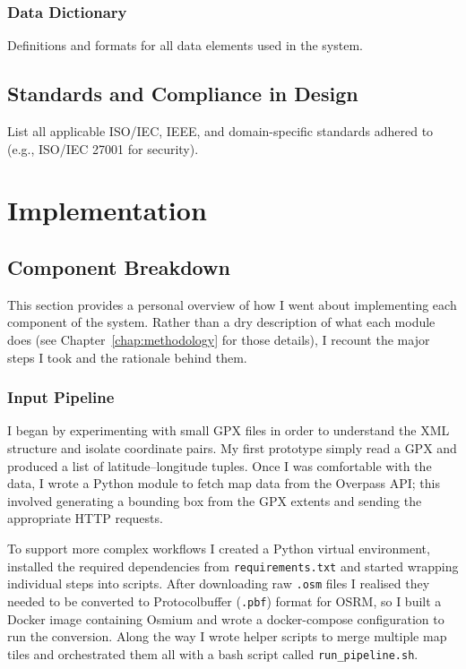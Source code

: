 \documentclass[11pt,a4paper]{report}
\begin{document}
\subsection{Data Dictionary}
Definitions and formats for all data elements used in the system.


\section{Standards and Compliance in Design}
List all applicable ISO/IEC, IEEE, and domain-specific standards adhered to (e.g., ISO/IEC 27001 for security).

\chapter{Implementation}
\label{chap:implement}

\section{Component Breakdown}
This section provides a personal overview of how I went about implementing each component of the system. Rather than a dry description of what each module does (see Chapter~\ref{chap:methodology} for those details), I recount the major steps I took and the rationale behind them.
\subsection{Input Pipeline}
I began by experimenting with small GPX files in order to understand the XML structure and isolate coordinate pairs. My first prototype simply read a GPX and produced a list of latitude--longitude tuples. Once I was comfortable with the data, I wrote a Python module to fetch map data from the Overpass API; this involved generating a bounding box from the GPX extents and sending the appropriate HTTP requests.

To support more complex workflows I created a Python virtual environment, installed the required dependencies from \texttt{requirements.txt} and started wrapping individual steps into scripts. After downloading raw \texttt{.osm} files I realised they needed to be converted to Protocolbuffer (\texttt{.pbf}) format for OSRM, so I built a Docker image containing Osmium and wrote a docker-compose configuration to run the conversion. Along the way I wrote helper scripts to merge multiple map tiles and orchestrated them all with a bash script called \texttt{run\_pipeline.sh}.
\end{document}
